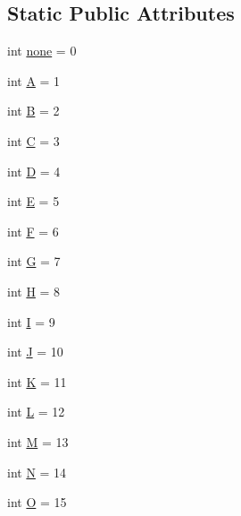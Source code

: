 \subsection*{Static Public Attributes}
\begin{DoxyCompactItemize}
\item 
int \hyperlink{classbridges_1_1named__symbol_1_1_named_symbol_a0d22eb05a76128d7a8848b263f32b851}{none} = 0
\item 
int \hyperlink{classbridges_1_1named__symbol_1_1_named_symbol_ad5f315e2dbd3b3c40e9ce00947bda2ca}{A} = 1
\item 
int \hyperlink{classbridges_1_1named__symbol_1_1_named_symbol_a496be7c4df83f50aa28ee6aaf63e92cf}{B} = 2
\item 
int \hyperlink{classbridges_1_1named__symbol_1_1_named_symbol_a0bc5f082b9a08bbfe8e30e8fc55434ba}{C} = 3
\item 
int \hyperlink{classbridges_1_1named__symbol_1_1_named_symbol_a24df9655aee332398622d1675355f6e4}{D} = 4
\item 
int \hyperlink{classbridges_1_1named__symbol_1_1_named_symbol_a77a54e04406ed9d84fd0f9835e433aa4}{E} = 5
\item 
int \hyperlink{classbridges_1_1named__symbol_1_1_named_symbol_a825003973fd3592c2564da32df47b7e1}{F} = 6
\item 
int \hyperlink{classbridges_1_1named__symbol_1_1_named_symbol_a3c14915c740b796131858662b6fb4cbb}{G} = 7
\item 
int \hyperlink{classbridges_1_1named__symbol_1_1_named_symbol_afb905428e457a17e3a26f42b7a275602}{H} = 8
\item 
int \hyperlink{classbridges_1_1named__symbol_1_1_named_symbol_a38cd2af55f5e54a95ffeb6646726f1e1}{I} = 9
\item 
int \hyperlink{classbridges_1_1named__symbol_1_1_named_symbol_ab202355c03209937ec4c11a64bc60baa}{J} = 10
\item 
int \hyperlink{classbridges_1_1named__symbol_1_1_named_symbol_ab14293a887b595c459f1b194d50dc9ae}{K} = 11
\item 
int \hyperlink{classbridges_1_1named__symbol_1_1_named_symbol_a0f5d08603fc2dde1d2f353ed78f4f41c}{L} = 12
\item 
int \hyperlink{classbridges_1_1named__symbol_1_1_named_symbol_a650c8c76ee91b4ba996985e4f75028f0}{M} = 13
\item 
int \hyperlink{classbridges_1_1named__symbol_1_1_named_symbol_a0d08f0a019f5d3e38aa0124c3a1aba3a}{N} = 14
\item 
int \hyperlink{classbridges_1_1named__symbol_1_1_named_symbol_a34ee8c1618b398fe87475eeea53ceed6}{O} = 15

\end{DoxyCompactItemize}
